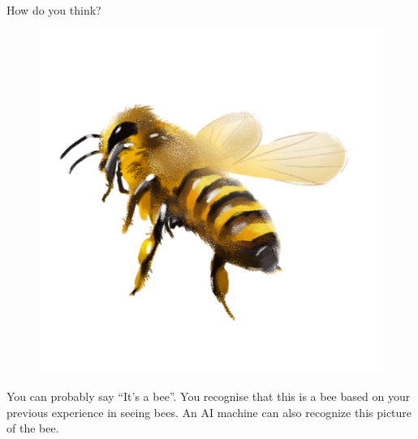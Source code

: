 \documentclass[final]{beamer}
\newlength{\colwidth}
\begin{document}
\begin{frame}{}
\begin{columns}[t]
\begin{column}{\colwidth}
\begin{myblock}{How do you think?}
\begin{minipage}{0.49\textwidth}
\begin{figure}
        \includegraphics[height=1.0\textwidth]{Bee.png}
        \end{figure}
    \end{minipage}
    
    \vspace{1cm}
    You can probably say “It’s a bee”. You recognise that this is a bee based on your previous experience in seeing bees. An AI machine can also recognize this picture of the bee.
    \end{myblock}


\end{column}
\end{columns}
\end{frame}
\end{document}
